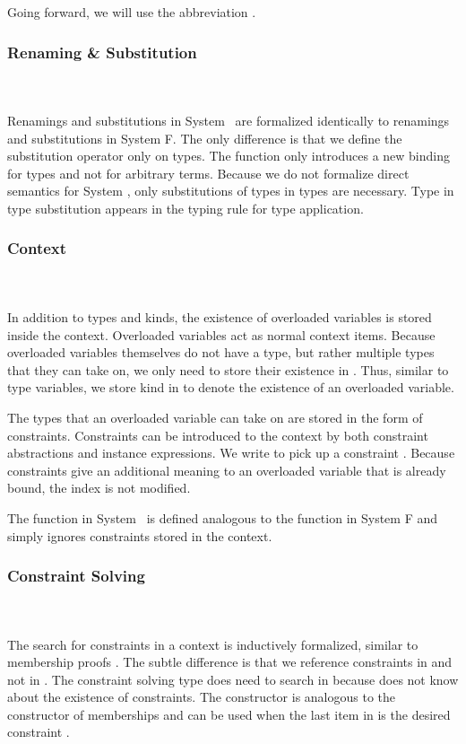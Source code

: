 \noindent Going forward, we will use the abbreviation \FoCstr.

\subsubsection{Renaming \& Substitution}\hfill\\\\
Renamings and substitutions in System \Fo\ are formalized identically to renamings and substitutions in System F. 
The only difference is that we define the substitution operator only on types. 
\Fosubs
The  function only introduces a new binding for types and not for arbitrary terms.
Because we do not formalize direct semantics for System \Fo, only substitutions of types in types are necessary. Type in type substitution appears in the typing rule for type application.

\subsubsection{Context}\hfill\\\\
In addition to types and kinds, the existence of overloaded variables is stored inside the context. Overloaded variables act as normal context items. 
Because overloaded variables themselves do not have a type, but rather multiple types that they can take on, we only need to store their existence in . Thus, similar to type variables, we store kind  in  to denote the existence of an overloaded variable. 

\noindent The types that an overloaded variable can take on are stored in the form of constraints. Constraints can be introduced to the context by both constraint abstractions and instance expressions.
\FoCtx
We write    to pick up a constraint . 
Because constraints give an additional meaning to an overloaded variable that is already bound, the index  is not modified. 

\noindent The  function in System \Fo\ is defined analogous to the  function in System F and simply ignores constraints stored in the context.

\subsubsection{Constraint Solving}\hfill\\\\
The search for constraints in a context is inductively formalized, similar to membership proofs   . The subtle difference is that we reference constraints in  and not in . The constraint solving type does need to search in  because  does not know about the existence of constraints.
\FoCstrSolve
The  constructor is analogous to the  constructor of memberships and can be used when the last item in  is the desired constraint .


